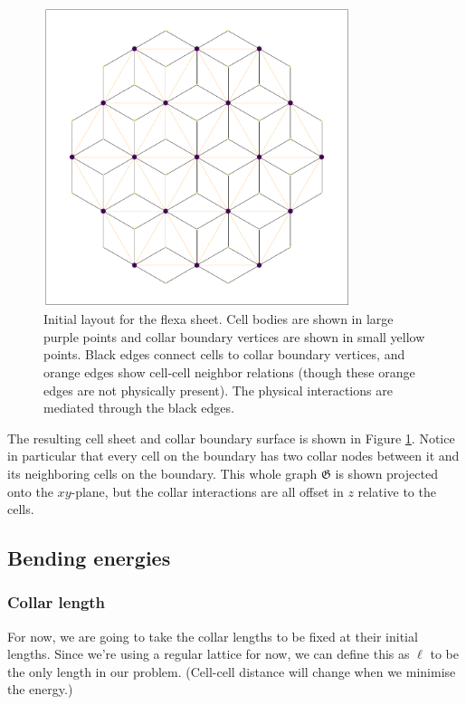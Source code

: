 \begin{figure}[hbtp]
    \centering
    \includegraphics[width=0.8\textwidth]{layout_init.png}
    \caption{Initial layout for the flexa sheet. Cell bodies are shown in large purple points and collar boundary vertices are shown in small yellow points. Black edges connect cells to collar boundary vertices, and orange edges show cell-cell neighbor relations (though these orange edges are not physically present). The physical interactions are mediated through the black edges.}
    \label{fig:layout_init}
\end{figure}

The resulting cell sheet and collar boundary surface is shown in Figure \ref{fig:layout_init}. Notice in particular that every cell on the boundary has two collar nodes between it and its neighboring cells on the boundary. This whole graph $\mathfrak{G}$ is shown projected onto the $xy$-plane, but the collar interactions are all offset in $z$ relative to the cells. 

\subsection{Bending energies}

\subsubsection{Collar length}
For now, we are going to take the collar lengths to be fixed at their initial lengths. Since we're using a regular lattice for now, we can define this as $\ell$ to be the only length in our problem. (Cell-cell distance will change when we minimise the energy.)


